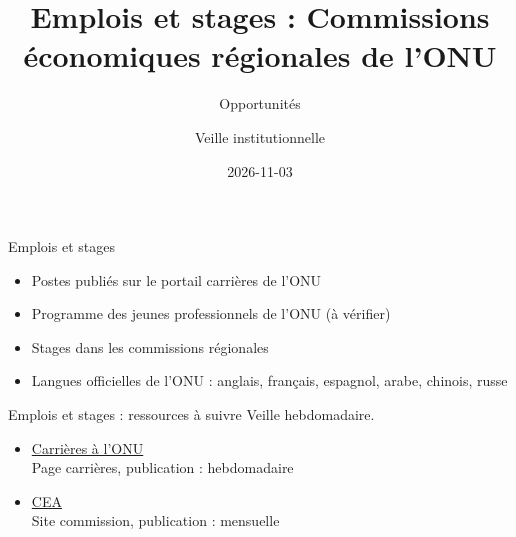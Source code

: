 \documentclass[aspectratio=169,11pt]{beamer}
\title{Emplois et stages : Commissions économiques régionales de l'ONU}
\subtitle{Opportunités}
\author{Veille institutionnelle}
\date{2026-11-03}
\begin{document}
\begin{frame}\titlepage\end{frame}

\begin{frame}{Emplois et stages}
\begin{itemize}
\item Postes publiés sur le portail carrières de l'ONU
\item Programme des jeunes professionnels de l'ONU (à vérifier)
\item Stages dans les commissions régionales
\item Langues officielles de l'ONU : anglais, français, espagnol, arabe, chinois, russe
\end{itemize}
\end{frame}

\begin{frame}{Emplois et stages : ressources à suivre}
\small
Veille hebdomadaire.
\begin{itemize}
\item \href{https://careers.un.org}{Carrières à l'ONU}\\{\footnotesize Page carrières, publication : hebdomadaire}
\item \href{https://www.uneca.org}{CEA}\\{\footnotesize Site commission, publication : mensuelle}
\end{itemize}
\end{frame}
\end{document}
